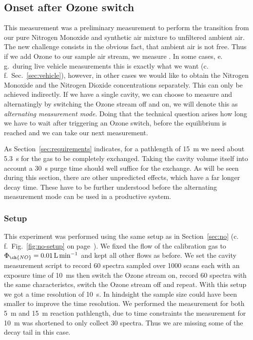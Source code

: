 \subsection{Onset after Ozone switch}
\label{sec:switch}

This measurement was a preliminary measurement to perform the
transition from our pure Nitrogen Monoxide and synthetic air mixture
to unfiltered ambient air. The new challenge consists in the obvious
fact, that ambient air is not  free. Thus if we add Ozone to
our sample air stream, we measure . In some
cases, e.\,g.\ during live vehicle measurements this is exactly what
we want (c.\,f.~Sec.~\ref{sec:vehicle}), however, in other cases we
would like to obtain the Nitrogen Monoxide and the Nitrogen Dioxide
concentrations separately. This can only be achieved indirectly. If we
have a single cavity, we can choose to measure  and 
alternatingly by switching the Ozone stream off and on, we will denote
this as \emph{alternating measurement mode}. Doing that the technical
question arises how long we have to wait after triggering an Ozone
switch, before the equilibrium is reached and we can take our next
measurement.

As Section~\ref{sec:requirements} indicates, for a pathlength of
\SI{15}{\meter} we need about \SI{5.3}{\second} for the gas to be
completely exchanged. Taking the cavity volume itself into account a
\SI{30}{\second} purge time should well suffice for the exchange. As
will be seen during this section, there are other unpredicted effects,
which have a far longer decay time. These have to be further
understood before the alternating measurement mode can be used in a
productive system.

\subsubsection{Setup}
\label{sec:switch-setup}

This experiment was performed using the same setup as in
Section~\ref{sec:no} (c.\,f.\ Fig.~\ref{fig:no-setup} on
page~\pageref{fig:no-setup}). We fixed the flow of the 
calibration gas to $\Phi_{\ch{NO}} = \SI{0.01}{\liter\per\minute}$ and
kept all other flows as before. We set the cavity measurement script
to record 60 spectra sampled over 1000 scans each with an exposure
time of \SI{10}{\milli\second} then switch the Ozone stream on, record
60 spectra with the same characteristcs, switch the Ozone stream off
and repeat. With this setup we got a time resolution of
\SI{10}{\second}. In hindsight the sample size could have been
smaller to improve the time resolution. We performed the measurement
for both \SI{5}{\meter} and \SI{15}{\meter} reaction pathlength, due
to time constraints the measurement for \SI{10}{\meter} was shortened
to only collect 30 spectra. Thus we are missing some of the decay tail
in this case.

